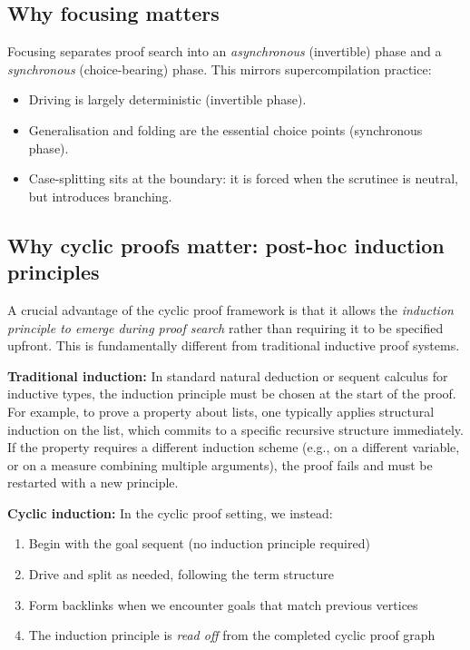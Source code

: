 \subsection{Why focusing matters}
Focusing separates proof search into an \emph{asynchronous} (invertible) phase and a \emph{synchronous} (choice-bearing) phase.
This mirrors supercompilation practice:
\begin{itemize}[leftmargin=*]
\item Driving is largely deterministic (invertible phase).
\item Generalisation and folding are the essential choice points (synchronous phase).
\item Case-splitting sits at the boundary: it is forced when the scrutinee is neutral, but introduces branching.
\end{itemize}

\subsection{Why cyclic proofs matter: post-hoc induction principles}
\label{sec:thesis:cyclic}

A crucial advantage of the cyclic proof framework is that it allows the \emph{induction principle to emerge during proof search} rather than requiring it to be specified upfront. This is fundamentally different from traditional inductive proof systems.

\textbf{Traditional induction:} In standard natural deduction or sequent calculus for inductive types, the induction principle must be chosen at the start of the proof. For example, to prove a property about lists, one typically applies structural induction on the list, which commits to a specific recursive structure immediately. If the property requires a different induction scheme (e.g., on a different variable, or on a measure combining multiple arguments), the proof fails and must be restarted with a new principle.

\textbf{Cyclic induction:} In the cyclic proof setting, we instead:
\begin{enumerate}
\item Begin with the goal sequent (no induction principle required)
\item Drive and split as needed, following the term structure
\item Form backlinks when we encounter goals that match previous vertices
\item The induction principle is \emph{read off} from the completed cyclic proof graph
\end{enumerate}

